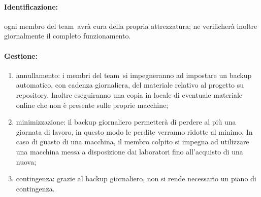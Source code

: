 \documentclass[../PianoProgetto.tex]{subfiles}
\begin{document}
		
	\paragraph*{Identificazione:} ogni membro del team\g\ avrà cura della propria attrezzatura; ne verificherà inoltre giornalmente il completo funzionamento.
	
	\paragraph*{Gestione:}
	\begin{enumerate}
		\item annullamento: i membri del team\g\ si impegneranno ad impostare un backup automatico, con cadenza giornaliera, del materiale relativo al progetto su repository\g . Inoltre eseguiranno una copia in locale di eventuale materiale online che non è presente sulle proprie macchine;
		\item minimizzazione: il backup giornaliero permetterà di perdere al più una giornata di lavoro, in questo modo le perdite verranno ridotte al minimo. In caso di guasto di una macchina, il membro colpito si impegna ad utilizzare una macchina messa a disposizione dai laboratori fino all'acquisto di una nuova;
		\item contingenza: grazie al backup giornaliero, non si rende necessario un piano di contingenza.
	\end{enumerate} 	
	
	
\end{document}
